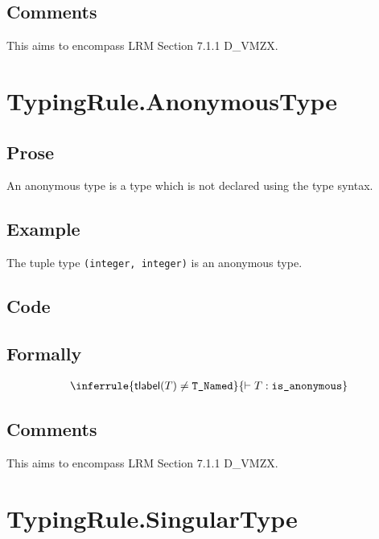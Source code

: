 \documentclass{book}
\newcommand\typelabel[0]{\textsf{tlabel}} %
\newcommand\isanonymous[0]{\texttt{is\_anonymous}}
\begin{document}
    \subsection{Comments}
    This aims to encompass LRM Section 7.1.1 D\_VMZX.

\section{TypingRule.AnonymousType \label{sec:TypingRule.AnonymousType}}

    \subsection{Prose} 
    An anonymous type is a type which is not declared using the type syntax. 

    \subsection{Example}
    The tuple type \texttt{(integer, integer)} is an anonymous type.

    \subsection{Code}

\begin{formal}
      \subsection{Formally}
\[
\begin{array}{c}
\inferrule{\typelabel(T) \neq \TNamed}{\entails T : \isanonymous}
\end{array}
\]
\end{formal}

    \subsection{Comments}
    This aims to encompass LRM Section 7.1.1 D\_VMZX.

\section{TypingRule.SingularType}
\end{document}
